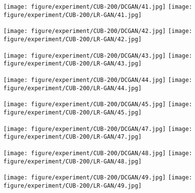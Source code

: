 \documentclass{article} \usepackage{iclr2017_conference,times}
\begin{document}
\begin{figure}[b]
\begin{minipage}{0.12\linewidth}
\texttt{[image: figure/experiment/CUB-200/DCGAN/41.jpg]}
\texttt{[image: figure/experiment/CUB-200/LR-GAN/41.jpg]}
\vspace{0.05cm}
\end{minipage}
\begin{minipage}{0.12\linewidth}
\texttt{[image: figure/experiment/CUB-200/DCGAN/42.jpg]}
\texttt{[image: figure/experiment/CUB-200/LR-GAN/42.jpg]}
\vspace{0.05cm}
\end{minipage}
\begin{minipage}{0.12\linewidth}
\texttt{[image: figure/experiment/CUB-200/DCGAN/43.jpg]}
\texttt{[image: figure/experiment/CUB-200/LR-GAN/43.jpg]}
\vspace{0.05cm}
\end{minipage}
\begin{minipage}{0.12\linewidth}
\texttt{[image: figure/experiment/CUB-200/DCGAN/44.jpg]}
\texttt{[image: figure/experiment/CUB-200/LR-GAN/44.jpg]}
\vspace{0.05cm}
\end{minipage}
\begin{minipage}{0.12\linewidth}
\texttt{[image: figure/experiment/CUB-200/DCGAN/45.jpg]}
\texttt{[image: figure/experiment/CUB-200/LR-GAN/45.jpg]}
\vspace{0.05cm}
\end{minipage}
\begin{minipage}{0.12\linewidth}
\texttt{[image: figure/experiment/CUB-200/DCGAN/47.jpg]}
\texttt{[image: figure/experiment/CUB-200/LR-GAN/47.jpg]}
\vspace{0.05cm}
\end{minipage}
\begin{minipage}{0.12\linewidth}
\texttt{[image: figure/experiment/CUB-200/DCGAN/48.jpg]}
\texttt{[image: figure/experiment/CUB-200/LR-GAN/48.jpg]}
\vspace{0.05cm}
\end{minipage}
\begin{minipage}{0.12\linewidth}
\texttt{[image: figure/experiment/CUB-200/DCGAN/49.jpg]}
\texttt{[image: figure/experiment/CUB-200/LR-GAN/49.jpg]}
\vspace{0.05cm}
\end{minipage}


\end{figure}
\end{document}
